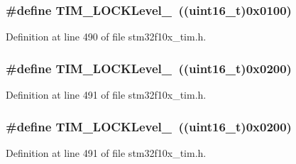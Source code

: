 \subsubsection[{\texorpdfstring{T\+I\+M\+\_\+\+L\+O\+C\+K\+Level\+\_\+1}{TIM_LOCKLevel_1}}]{\setlength{\rightskip}{0pt plus 5cm}\#define T\+I\+M\+\_\+\+L\+O\+C\+K\+Level\+\_~(({\bf uint16\+\_\+t})0x0100)}\hypertarget{group___lock__level_ga7e4326fc7756ebf5e9eb9776c2734aea}{}\label{group___lock__level_ga7e4326fc7756ebf5e9eb9776c2734aea}


Definition at line 490 of file stm32f10x\+\_\+tim.\+h.

\subsubsection[{\texorpdfstring{T\+I\+M\+\_\+\+L\+O\+C\+K\+Level\+\_\+2}{TIM_LOCKLevel_2}}]{\setlength{\rightskip}{0pt plus 5cm}\#define T\+I\+M\+\_\+\+L\+O\+C\+K\+Level\+\_~(({\bf uint16\+\_\+t})0x0200)}\hypertarget{group___lock__level_ga91bdf218f766e6a10b7a7df407250d25}{}\label{group___lock__level_ga91bdf218f766e6a10b7a7df407250d25}


Definition at line 491 of file stm32f10x\+\_\+tim.\+h.

\subsubsection[{\texorpdfstring{T\+I\+M\+\_\+\+L\+O\+C\+K\+Level\+\_\+2}{TIM_LOCKLevel_2}}]{\setlength{\rightskip}{0pt plus 5cm}\#define T\+I\+M\+\_\+\+L\+O\+C\+K\+Level\+\_~(({\bf uint16\+\_\+t})0x0200)}\hypertarget{group___lock__level_ga91bdf218f766e6a10b7a7df407250d25}{}\label{group___lock__level_ga91bdf218f766e6a10b7a7df407250d25}


Definition at line 491 of file stm32f10x\+\_\+tim.\+h.

